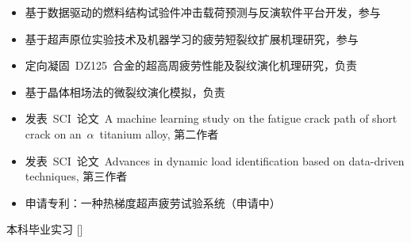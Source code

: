 \documentclass[zh]{resume}
\begin{document}
\begin{paracol}{2}
\begin{itemize}
  \item 基于数据驱动的燃料结构试验件冲击载荷预测与反演软件平台开发，参与
  \item 基于超声原位实验技术及机器学习的疲劳短裂纹扩展机理研究，参与
  \item 定向凝固~DZ125~合金的超高周疲劳性能及裂纹演化机理研究，负责
  \item 基于晶体相场法的微裂纹演化模拟，负责
\end{itemize}


\begin{itemize}
  \item 发表~SCI~论文~A machine learning study on the fatigue crack path of short crack on an~$\alpha$~titanium alloy, 第二作者
  \item 发表~SCI~论文~Advances in dynamic load identification based on data-driven techniques, 第三作者
  \item 申请专利：一种热梯度超声疲劳试验系统（申请中）
\end{itemize}

\begin{experiences}
    {本科毕业实习}%
    []
\end{experiences}





\end{paracol}
\end{document}
